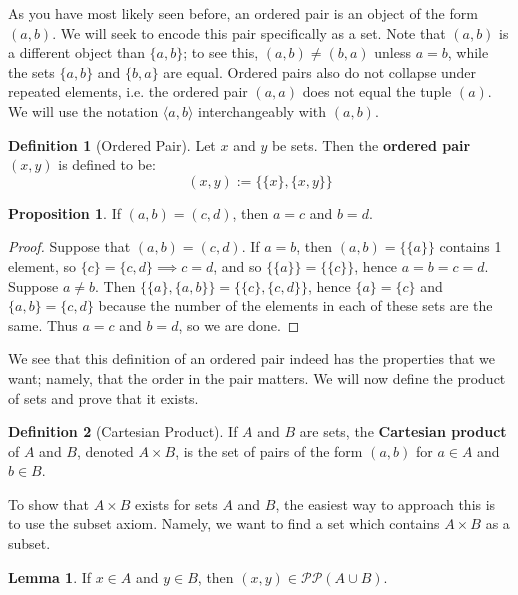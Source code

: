 \documentclass[11pt, oneside]{article}   	%
\theoremstyle{definition}
\newtheorem{definition}{Definition}[section]
\newtheorem{lemma}[theorem]{Lemma}
\newtheorem{prop}[theorem]{Proposition}
\begin{document}
As you have most likely seen before, an ordered pair is an object of the form $(a, b)$. We will seek to encode this pair 
specifically as a set. Note that $(a, b)$ is a different object than $\{a, b\}$; to see this, $(a, b)\neq (b, a)$ unless $a = b$, while 
the sets $\{a, b\}$ and $\{b, a\}$ are equal. Ordered pairs also do not collapse under repeated elements, i.e. the ordered 
pair $(a, a)$ does not equal the tuple $(a)$. We will use the notation $\langle a, b\rangle$ interchangeably with $(a, b)$. 

\begin{definition}[Ordered Pair]
	Let $x$ and $y$ be sets. Then the \textbf{ordered pair} $(x, y)$ is defined to be:
	\begin{equation}
		(x, y) := \{\{x\}, \{x, y\}\}
	\end{equation}
\end{definition}

\begin{prop}
	If $(a, b) = (c, d)$, then $a = c$ and $b = d$. 
\end{prop}

\begin{proof}
	Suppose that $(a, b) = (c, d)$. If $a = b$, then $(a, b) = \{\{a\}\}$ contains 1 element, so $\{c\} = \{c, d\}\implies c = d$, 
	and so $\{\{a\}\} = \{\{c\}\}$, hence $a = b = c = d$. Suppose $a\neq b$. Then $\{\{a\}, \{a, b\}\} = \{\{c\}, \{c, d\}\}$, hence 
	$\{a\} = \{c\}$ and $\{a, b\} = \{c, d\}$ because the number of the elements in each of these sets are the same. Thus 
	$a = c$ and $b = d$, so we are done.
\end{proof}

We see that this definition of an ordered pair indeed has the properties that we want; namely, that the order in the pair matters. 
We will now define the product of sets and prove that it exists.

\begin{definition}[Cartesian Product]
	If $A$ and $B$ are sets, the \textbf{Cartesian product} of $A$ and $B$, denoted $A\times B$, is the set of pairs of the 
	form $(a, b)$ for $a\in A$ and $b\in B$.
\end{definition}

To show that $A\times B$ exists for sets $A$ and $B$, the easiest way to approach this is to use the subset axiom. Namely, we 
want to find a set which contains $A\times B$ as a subset.

\begin{lemma}
	If $x\in A$ and $y\in B$, then $(x, y)\in \mathcal P\mathcal P (A\cup B)$. 
\end{lemma}
\end{document}
